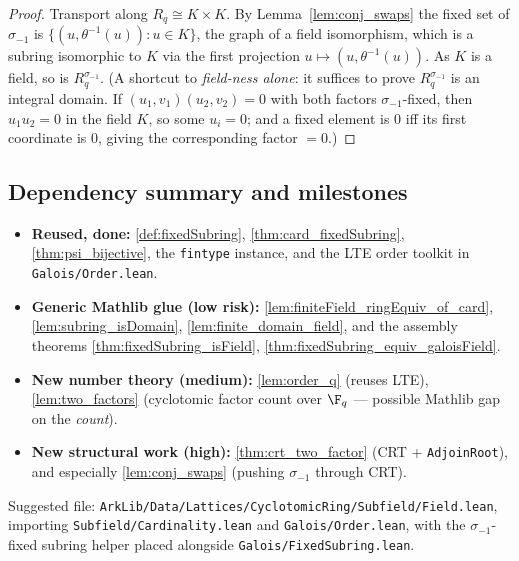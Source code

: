 \begin{proof}
Transport along $R_q \cong K \times K$. By Lemma~\ref{lem:conj_swaps} the fixed set of
$\sigma_{-1}$ is $\{(u, \theta^{-1}(u)) : u \in K\}$, the graph of a field isomorphism, which is a
subring isomorphic to $K$ via the first projection $u \mapsto (u, \theta^{-1}(u))$. As $K$ is a
field, so is $R_q^{\sigma_{-1}}$.
(A shortcut to \emph{field-ness alone}: it suffices to prove $R_q^{\sigma_{-1}}$ is an integral
domain. If $(u_1,v_1)(u_2,v_2) = 0$ with both factors $\sigma_{-1}$-fixed, then $u_1 u_2 = 0$ in
the field $K$, so some $u_i = 0$; and a fixed element is $0$ iff its first coordinate is $0$,
giving the corresponding factor $= 0$.)
\end{proof}

\subsection{Dependency summary and milestones}

\begin{itemize}
  \item \textbf{Reused, done:} \ref{def:fixedSubring}, \ref{thm:card_fixedSubring},
        \ref{thm:psi_bijective}, the \texttt{fintype} instance, and the LTE order toolkit in
        \texttt{Galois/Order.lean}.
  \item \textbf{Generic Mathlib glue (low risk):} \ref{lem:finiteField_ringEquiv_of_card},
        \ref{lem:subring_isDomain}, \ref{lem:finite_domain_field}, and the assembly theorems
        \ref{thm:fixedSubring_isField}, \ref{thm:fixedSubring_equiv_galoisField}.
  \item \textbf{New number theory (medium):} \ref{lem:order_q} (reuses LTE),
        \ref{lem:two_factors} (cyclotomic factor count over $\F_q$ --- possible Mathlib gap on the
        \emph{count}).
  \item \textbf{New structural work (high):} \ref{thm:crt_two_factor} (CRT + \texttt{AdjoinRoot}),
        and especially \ref{lem:conj_swaps} (pushing $\sigma_{-1}$ through CRT).
\end{itemize}

\noindent
Suggested file: \texttt{ArkLib/Data/Lattices/CyclotomicRing/Subfield/Field.lean}, importing
\texttt{Subfield/Cardinality.lean} and \texttt{Galois/Order.lean}, with the
$\sigma_{-1}$-fixed subring helper placed alongside \texttt{Galois/FixedSubring.lean}.
